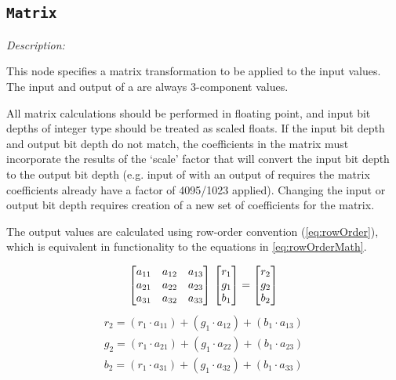 \subsection{\texttt{Matrix}}

\emph{Description:} \par
This node specifies a matrix transformation to be applied to the input values. The input and output of a  are always 3-component values. 

All matrix calculations should be performed in floating point, and input bit depths of integer type should be treated as scaled floats. If the input bit depth and output bit depth do not match, the coefficients in the matrix must incorporate the results of the `scale' factor that will convert the input bit depth to the output bit depth (e.g. input of  with an output of  requires the matrix coefficients already have a factor of 4095/1023 applied). Changing the input or output bit depth requires creation of a new set of coefficients for the matrix.

The output values are calculated using row-order convention (\autoref{eq:rowOrder}), which is equivalent in functionality to the equations in \ref{eq:rowOrderMath}.

\begin{equation} \label{eq:rowOrder}
    \begin{bmatrix*}
        a_{11} & a_{12} & a_{13} \\
        a_{21} & a_{22} & a_{23} \\
        a_{31} & a_{32} & a_{33} \\
    \end{bmatrix*} \\
    \begin{bmatrix}
        r_1\\
        g_1\\
        b_1
    \end{bmatrix}
    =
    \begin{bmatrix}
        r_2\\
        g_2\\
        b_2
    \end{bmatrix}
\end{equation}
\begin{equation} \label{eq:rowOrderMath}
    \begin{aligned}
        r_2 = (r_1 \cdot a_{11}) + (g_1 \cdot a_{12}) + (b_1 \cdot a_{13}) \\
        g_2 = (r_1 \cdot a_{21}) + (g_1 \cdot a_{22}) + (b_1 \cdot a_{23}) \\
        b_2 = (r_1 \cdot a_{31}) + (g_1 \cdot a_{32}) + (b_1 \cdot a_{33})
    \end{aligned}    
\end{equation}

